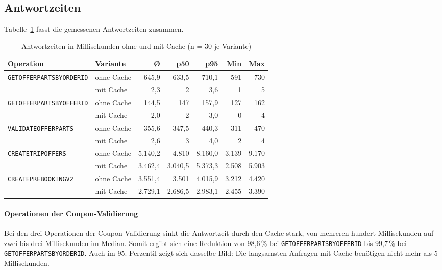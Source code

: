 \subsection{Antwortzeiten}
\label{subsec:ergebnis_antwortzeiten}

Tabelle~\ref{tab:ergebnis_antwortzeiten} fasst die gemessenen Antwortzeiten zusammen.

\begin{table}[htbp]
    \centering
    \small
    \setlength{\tabcolsep}{4pt}
    \begin{tabular}{l l r r r r r}
        \hline
        \textbf{Operation} & \textbf{Variante} & \textbf{Ø} & \textbf{p50} & \textbf{p95} & \textbf{Min} & \textbf{Max} \\
        \hline
        \texttt{GETOFFERPARTSBYORDERID} & ohne Cache & 645,9 & 633,5 & 710,1 & 591 & 730 \\
                                        & mit Cache  & 2,3   & 2     & 3,6   & 1   & 5 \\
        \hline
        \texttt{GETOFFERPARTSBYOFFERID} & ohne Cache & 144,5 & 147   & 157,9 & 127 & 162 \\
                                        & mit Cache  & 2,0   & 2     & 3,0   & 0   & 4 \\
        \hline
        \texttt{VALIDATEOFFERPARTS}     & ohne Cache & 355,6 & 347,5 & 440,3 & 311 & 470 \\
                                        & mit Cache  & 2,6   & 3     & 4,0   & 2   & 4 \\
        \hline
        \texttt{CREATETRIPOFFERS}       & ohne Cache & 5.140,2 & 4.810   & 8.160,0 & 3.139 & 9.170 \\
                                        & mit Cache  & 3.462,4 & 3.040,5 & 5.373,3 & 2.508 & 5.903 \\
        \hline
        \texttt{CREATEPREBOOKINGV2}     & ohne Cache & 3.551,4 & 3.501   & 4.015,9 & 3.212 & 4.420 \\
                                        & mit Cache  & 2.729,1 & 2.686,5 & 2.983,1 & 2.455 & 3.390 \\
        \hline
    \end{tabular}
    \caption{Antwortzeiten in Millisekunden ohne und mit Cache (n = 30 je Variante)}
    \label{tab:ergebnis_antwortzeiten}
\end{table}

\paragraph{Operationen der Coupon-Validierung}
Bei den drei Operationen der Coupon-Validierung sinkt die Antwortzeit durch den Cache stark, von mehreren hundert Millisekunden auf zwei bis drei Millisekunden im Median. Somit ergibt sich eine Reduktion von 98,6\,\% bei \texttt{GETOFFERPARTSBYOFFERID} bis 99,7\,\% bei \texttt{GETOFFERPARTSBYORDERID}. Auch im 95. Perzentil zeigt sich dasselbe Bild: Die langsamsten Anfragen mit Cache benötigen nicht mehr als 5 Millisekunden.

